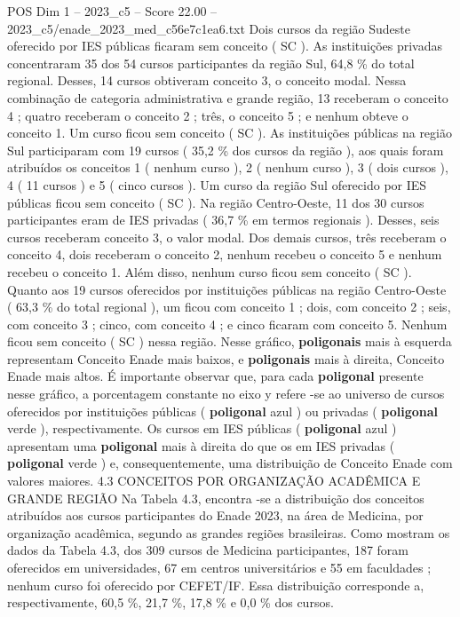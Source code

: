 \begin{textsample}{POS Dim 1 – 2023\_c5 – Score 22.00 – 2023\_c5/enade\_2023\_med\_c56e7c1ea6.txt}
Dois cursos da região Sudeste oferecido por IES públicas ficaram sem conceito ( SC ).
As instituições privadas concentraram 35 dos 54 cursos participantes da região Sul, 64,8 \% do total regional.
Desses, 14 cursos obtiveram conceito 3, o conceito modal.
Nessa combinação de categoria administrativa e grande região, 13 receberam o conceito 4 ; quatro receberam o conceito 2 ; três, o conceito 5 ; e nenhum obteve o conceito 1.
Um curso ficou sem conceito ( SC ).
As instituições públicas na região Sul participaram com 19 cursos ( 35,2 \% dos cursos da região ), aos quais foram atribuídos os conceitos 1 ( nenhum curso ), 2 ( nenhum curso ), 3 ( dois cursos ), 4 ( 11 cursos ) e 5 ( cinco cursos ).
Um curso da região Sul oferecido por IES públicas ficou sem conceito ( SC ).
Na região Centro-Oeste, 11 dos 30 cursos participantes eram de IES privadas ( 36,7 \% em termos regionais ).
Desses, seis cursos receberam conceito 3, o valor modal.
Dos demais cursos, três receberam o conceito 4, dois receberam o conceito 2, nenhum recebeu o conceito 5 e nenhum recebeu o conceito 1.
Além disso, nenhum curso ficou sem conceito ( SC ).
Quanto aos 19 cursos oferecidos por instituições públicas na região Centro-Oeste ( 63,3 \% do total regional ), um ficou com conceito 1 ; dois, com conceito 2 ; seis, com conceito 3 ; cinco, com conceito 4 ; e cinco ficaram com conceito 5.
Nenhum ficou sem conceito ( SC ) nessa região.
Nesse gráfico, \textbf{poligonais} mais à esquerda representam Conceito Enade mais baixos, e \textbf{poligonais} mais à direita, Conceito Enade mais altos.
É importante observar que, para cada \textbf{poligonal} presente nesse gráfico, a porcentagem constante no eixo y refere -se ao universo de cursos oferecidos por instituições públicas ( \textbf{poligonal} azul ) ou privadas ( \textbf{poligonal} verde ), respectivamente.
Os cursos em IES públicas ( \textbf{poligonal} azul ) apresentam uma \textbf{poligonal} mais à direita do que os em IES privadas ( \textbf{poligonal} verde ) e, consequentemente, uma distribuição de Conceito Enade com valores maiores. 4.3 CONCEITOS POR ORGANIZAÇÃO ACADÊMICA E GRANDE REGIÃO Na Tabela 4.3, encontra -se a distribuição dos conceitos atribuídos aos cursos participantes do Enade 2023, na área de Medicina, por organização acadêmica, segundo as grandes regiões brasileiras.
Como mostram os dados da Tabela 4.3, dos 309 cursos de Medicina participantes, 187 foram oferecidos em universidades, 67 em centros universitários e 55 em faculdades ; nenhum curso foi oferecido por CEFET/IF.
Essa distribuição corresponde a, respectivamente, 60,5 \%, 21,7 \%, 17,8 \% e 0,0 \% dos cursos.

\end{textsample}
